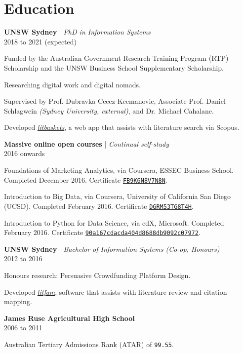 \section*{Education}

\noindent \textbf{UNSW Sydney} | \textit{PhD in Information Systems}
\\ 2018 to 2021 (expected)
\begin{myitemize}
	\item Funded by the Australian Government Research Training Program (RTP) Scholarship and the UNSW Business School Supplementary Scholarship.
	\item Researching digital work and digital nomads.
	\item Supervised by Prof. Dubravka Cecez-Kecmanovic, Associate Prof. Daniel Schlagwein \textit{(Sydney University, external)}, and Dr. Michael Cahalane.
	\item Developed \textit{\href{http://litbaskets.io/}{litbaskets}}, a web app that assists with literature search via Scopus.
\end{myitemize}

\vspace{20pt}

\noindent \textbf{Massive online open courses} | \textit{Continual self-study}
\\ 2016 onwards
\begin{myitemize}
	\item Foundations of Marketing Analytics, via Coursera, ESSEC Business School. Completed December 2016. Certificate \texttt{\href{https://www.coursera.org/account/accomplishments/certificate/FB9K6N8V7N8N}{FB9K6N8V7N8N}}.
	\item Introduction to Big Data, via Coursera, University of California San Diego (UCSD). Completed February 2016. Certificate \texttt{\href{https://www.coursera.org/account/accomplishments/certificate/DGRM53TG8T4H}{DGRM53TG8T4H}}.
	\item Introduction to Python for Data Science, via edX, Microsoft. Completed February 2016. Certificate \texttt{\href{https://courses.edx.org/certificates/90a167cdacda404d8688db9092c07972}{90a167cdacda404d8688db9092c07972}}.
\end{myitemize}

\pagebreak

\noindent \textbf{UNSW Sydney} | \textit{Bachelor of Information Systems (Co-op, Honours)}
\\ 2012 to 2016
\begin{myitemize}
	\item Honours research: Persuasive Crowdfunding Platform Design.
	\item Developed \textit{\href{https://github.com/blairw/litfam}{litfam}}, software that assists with literature review and citation mapping.
\end{myitemize}

\vspace{20pt}

\noindent \textbf{James Ruse Agricultural High School}
\\ 2006 to 2011
\begin{myitemize}
	\item Australian Tertiary Admissions Rank (ATAR) of \texttt{99.55}.
\end{myitemize}